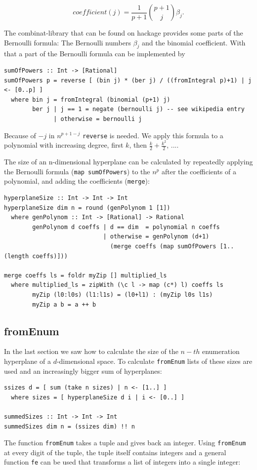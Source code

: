 \documentclass{tmr}
\begin{document}
\begin{equation} \label{bernoulli}
coefficient(j) = \frac{1}{p+1} \binom{p+1}{j} \beta_{j}.
\end{equation}

The combinat-library that can be found on hackage provides some parts of the Bernoulli formula: The Bernoulli numbers $\beta_{j}$ and the binomial coefficient. With that a part of the Bernoulli formula can be implemented by

\small
\begin{Verbatim}
sumOfPowers :: Int -> [Rational]
sumOfPowers p = reverse [ (bin j) * (ber j) / ((fromIntegral p)+1) | j <- [0..p] ]
  where bin j = fromIntegral (binomial (p+1) j)
        ber j | j == 1 = negate (bernoulli j) -- see wikipedia entry
              | otherwise = bernoulli j
\end{Verbatim}

Because of $-j$ in $n^{p+1-j}$ \verb|reverse| is needed.
We apply this formula to a polynomial with increasing degree, first $k$, then $\frac{k}{2} + \frac{k^2}{2}$, ....

The size of an n-dimensional hyperplane can be calculated by repeatedly applying the Bernoulli formula (\verb|map sumOfPowers|) to the $n^p$ after the coefficients of a polynomial, and adding the coefficients (\verb|merge|):

\small
\begin{Verbatim}
hyperplaneSize :: Int -> Int -> Int
hyperplaneSize dim n = round (genPolynom 1 [1])
  where genPolynom :: Int -> [Rational] -> Rational
        genPolynom d coeffs | d == dim  = polynomial n coeffs
                            | otherwise = genPolynom (d+1)
                              (merge coeffs (map sumOfPowers [1..(length coeffs)]))

merge coeffs ls = foldr myZip [] multiplied_ls
  where multiplied_ls = zipWith (\c l -> map (c*) l) coeffs ls
        myZip (l0:l0s) (l1:l1s) = (l0+l1) : (myZip l0s l1s)
        myZip a b = a ++ b
\end{Verbatim}

\subsection {fromEnum }
In the last section we saw how to calculate the size  of the $n-th$ enumeration hyperplane of a $d$-dimensional space. To calculate \verb|fromEnum| lists of these sizes are used and an increasingly bigger sum of hyperplanes:

\begin{Verbatim}
ssizes d = [ sum (take n sizes) | n <- [1..] ]
  where sizes = [ hyperplaneSize d i | i <- [0..] ]

summedSizes :: Int -> Int -> Int
summedSizes dim n = (ssizes dim) !! n
\end{Verbatim}
The function \verb|fromEnum| takes a tuple and gives back an integer. Using \verb|fromEnum| at every digit of the tuple, the tuple itself contains integers and a general function \verb|fe| can be used that transforms a list of integers into a single integer:
\end{document}
